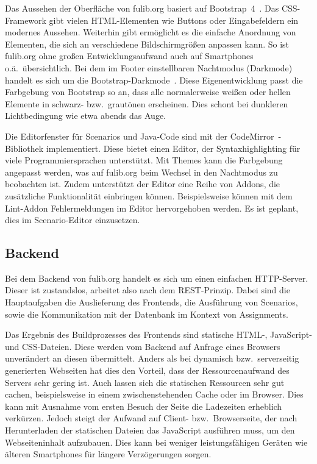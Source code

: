 Das Aussehen der Oberfläche von fulib.org basiert auf Bootstrap~4~\cite{bootstrap}.
Das CSS-Framework gibt vielen HTML-Elementen wie Buttons oder Eingabefeldern ein modernes Aussehen.
Weiterhin gibt ermöglicht es die einfache Anordnung von Elementen, die sich an verschiedene Bildschirmgrößen anpassen kann.
So ist fulib.org ohne großen Entwicklungsaufwand auch auf Smartphones o.ä.\ übersichtlich.
Bei dem im Footer einstellbaren Nachtmodus (Darkmode) handelt es sich um die Bootstrap-Darkmode~\cite{bootstrap-darkmode}.
Diese Eigenentwicklung passt die Farbgebung von Bootstrap so an, dass alle normalerweise weißen oder hellen Elemente in schwarz- bzw.\ grautönen erscheinen.
Dies schont bei dunkleren Lichtbedingung wie etwa abends das Auge.

Die Editorfenster für Scenarios und Java-Code sind mit der CodeMirror~\cite{codemirror}-Bibliothek implementiert.
Diese bietet einen Editor, der Syntaxhighlighting für viele Programmiersprachen unterstützt.
Mit Themes kann die Farbgebung angepasst werden, was auf fulib.org beim Wechsel in den Nachtmodus zu beobachten ist.
Zudem unterstützt der Editor eine Reihe von Addons, die zusätzliche Funktionalität einbringen können.
Beispielsweise können mit dem Lint-Addon Fehlermeldungen im Editor hervorgehoben werden.
Es ist geplant, dies im Scenario-Editor einzusetzen.

\subsection{Backend}\label{subsec:backend}

Bei dem Backend von fulib.org handelt es sich um einen einfachen HTTP-Server.
Dieser ist zustandslos, arbeitet also nach dem REST-Prinzip.
Dabei sind die Hauptaufgaben die Auslieferung des Frontends,
die Ausführung von Scenarios,
sowie die Kommunikation mit der Datenbank im Kontext von Assignments.

Das Ergebnis des Buildprozesses des Frontends sind statische HTML-, JavaScript- und CSS-Dateien.
Diese werden vom Backend auf Anfrage eines Browsers unverändert an diesen übermittelt.
Anders als bei dynamisch bzw.\ serverseitig generierten Webseiten hat dies den Vorteil,
dass der Ressourcenaufwand des Servers sehr gering ist.
Auch lassen sich die statischen Ressourcen sehr gut cachen,
beispielsweise in einem zwischenstehenden Cache oder im Browser.
Dies kann mit Ausnahme vom ersten Besuch der Seite die Ladezeiten erheblich verkürzen.
Jedoch steigt der Aufwand auf Client- bzw.\ Browserseite,
der nach Herunterladen der statischen Dateien das JavaScript ausführen muss, um den Webseiteninhalt aufzubauen.
Dies kann bei weniger leistungsfähigen Geräten wie älteren Smartphones für längere Verzögerungen sorgen.

